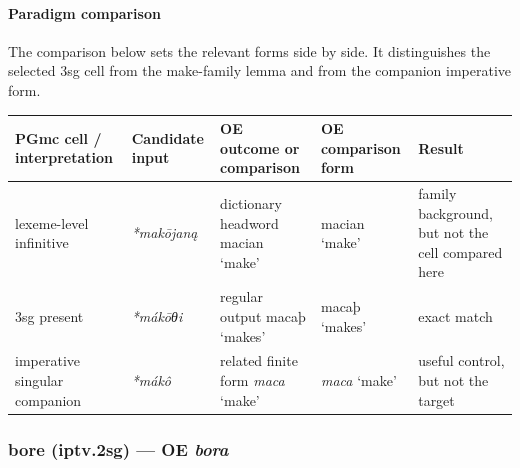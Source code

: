 \documentclass[
  british,
  a4paper,
]{article}
\newcounter{none} %
\begin{document}
\paragraph{Paradigm comparison}\label{paradigm-comparison-18}

The comparison below sets the relevant forms side by side. It
distinguishes the selected 3sg cell from the make-family lemma and from
the companion imperative form.

{\def\LTcaptype{none} %
\begin{longtable}[]{@{}
  >{\raggedright\arraybackslash}p{}
  >{\raggedright\arraybackslash}p{}
  >{\raggedright\arraybackslash}p{}
  >{\raggedright\arraybackslash}p{}
  >{\raggedright\arraybackslash}p{}@{}}
\toprule\noalign{}
\begin{minipage}[b]{\linewidth}\raggedright
PGmc cell / interpretation
\end{minipage} & \begin{minipage}[b]{\linewidth}\raggedright
Candidate input
\end{minipage} & \begin{minipage}[b]{\linewidth}\raggedright
OE outcome or comparison
\end{minipage} & \begin{minipage}[b]{\linewidth}\raggedright
OE comparison form
\end{minipage} & \begin{minipage}[b]{\linewidth}\raggedright
Result
\end{minipage} \\
\midrule\noalign{}
\endhead
\bottomrule\noalign{}
\endlastfoot
lexeme-level infinitive & {\emph{*makōjaną}} & dictionary headword
{macian} `make' & {macian} `make' & family background, but not the cell
compared here \\
3sg present & {\emph{*mákōθi}} & regular output {macaþ} `makes' &
{macaþ} `makes' & exact match \\
imperative singular companion & {\emph{*mákô}} & related finite form
{\emph{maca}} `make' & {\emph{maca}} `make' & useful control, but not
the target \\
\end{longtable}
}

\subsubsection{\texorpdfstring{bore (iptv.2sg) --- OE
\emph{bora}}{bore (iptv.2sg) --- OE bora}}\label{bore-iptv.2sg-oe-bora}
\end{document}
